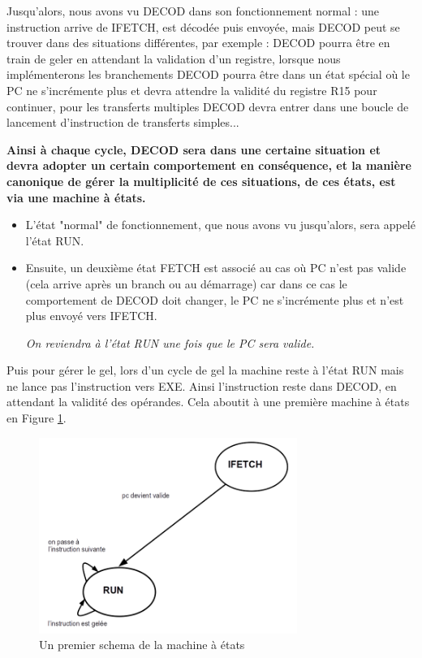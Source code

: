 \documentclass{article}
\begin{document}
Jusqu'alors, nous avons vu DECOD dans son fonctionnement normal : une instruction arrive de IFETCH,
est décodée puis envoyée, mais DECOD peut se trouver dans des situations différentes, par exemple :
DECOD pourra être en train de geler en attendant la validation d'un registre,
lorsque nous implémenterons les branchements DECOD pourra être dans un état spécial où le PC ne s'incrémente
plus et devra attendre la validité du registre R15 pour continuer, pour les transferts multiples
DECOD devra entrer dans une boucle de lancement d'instruction de transferts simples...

\textbf{Ainsi à chaque cycle, DECOD sera dans une certaine situation et devra adopter un certain
comportement en conséquence, et la manière canonique de gérer la multiplicité de ces situations,
de ces états, est via une machine à états.}

\begin{itemize}
 \item L'état "normal" de fonctionnement, que nous avons vu jusqu'alors, sera appelé l'état RUN.
 \item Ensuite, un deuxième état FETCH est associé au cas où PC n'est pas valide
   (cela arrive après un branch ou au démarrage) car dans ce cas le comportement de DECOD doit changer,
   le PC ne s'incrémente plus et n'est plus envoyé vers IFETCH.

   \textit{On reviendra à l'état RUN une fois que le PC sera valide.}
\end{itemize}

Puis pour gérer le gel, lors d'un cycle de gel la machine reste à l'état RUN mais ne lance pas l'instruction
vers EXE. Ainsi l'instruction reste dans DECOD, en attendant la validité des opérandes.
Cela aboutit à une première machine à états en Figure \ref{mae_part}.

\begin{figure}[H]
\includegraphics[width=0.75\textwidth]{pics/mae_part.png}
\centering
\caption{Un premier schema de la machine à états}
\label{mae_part}
\end{figure}
\end{document}
